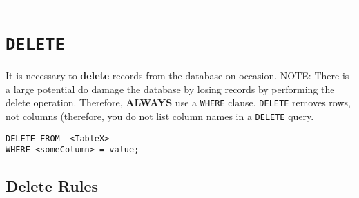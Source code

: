 \documentclass{article}
\begin{document}
\hspace{-0.5cm}\rule[-0.101in]{\textwidth}{0.0025in}
  
  



















\section*{\texttt{DELETE}}
It is necessary to \textbf{delete} records from the database on occasion.  NOTE: There is a large potential do damage the database by losing records by performing the delete operation.  Therefore, \textbf{ALWAYS} use a \texttt{WHERE} clause.  \texttt{DELETE} removes rows, not columns (therefore, you do not list column names in a \texttt{DELETE} query.  
 
 
 
 
 
 
  
\begin{lstlisting}[frame=single]  
DELETE FROM  <TableX> 
WHERE <someColumn> = value;
\end{lstlisting} 





 
 \subsection*{Delete Rules}
\end{document}
